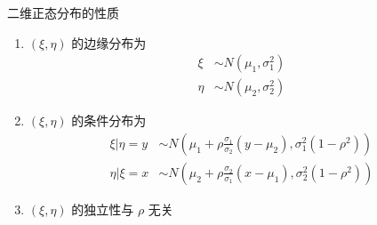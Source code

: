 \documentclass[12pt,a4paper]{amsart}
\begin{document}
\begin{proposition}
    二维正态分布的性质
    \begin{enumerate}
        \item $(\xi, \eta)$ 的边缘分布为
        \begin{equation}
            \begin{aligned}
                \xi &\sim N(\mu_1, \sigma_1^2) \\
                \eta &\sim N(\mu_2, \sigma_2^2)
            \end{aligned}
        \end{equation}
        \item $(\xi, \eta)$ 的条件分布为
        \begin{equation}
            \begin{aligned}
                \xi|\eta = y &\sim N\left(\mu_1+\rho\frac{\sigma_1}{\sigma_2}(y-\mu_2), \sigma_1^2(1-\rho^2)\right) \\
                \eta|\xi = x &\sim N\left(\mu_2+\rho\frac{\sigma_2}{\sigma_1}(x-\mu_1), \sigma_2^2(1-\rho^2)\right)
            \end{aligned}
        \end{equation}
        \item $(\xi, \eta)$ 的独立性与 $\rho$ 无关
    \end{enumerate}
\end{proposition}

\appendix



{\footnotesize}
\end{document}
